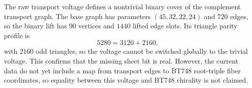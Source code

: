 
\makeatletter
{}
\makeatother
\providecommand{\PSp}{\mathrm{PSp}}
\providecommand{\Aut}{\mathrm{Aut}}
\providecommand{\spec}{\operatorname{spec}}


\begin{remark}
\label{rem:voltage-chirality-obstruction}
The raw transport voltage defines a nontrivial binary cover of the complement
transport graph.  The base graph has parameters $(45,32,22,24)$ and $720$ edges,
so the binary lift has $90$ vertices and $1440$ lifted edge slots.  Its triangle
parity profile is
\[
  5280=3120+2160,
\]
with $2160$ odd triangles, so the voltage cannot be switched globally to the
trivial voltage.  This confirms that the missing sheet bit is real.  However,
the current data do not yet include a map from transport edges to BT748
root-triple fiber coordinates, so equality between this voltage and BT748
chirality is not claimed.
\end{remark}
